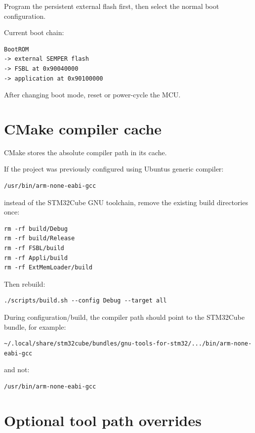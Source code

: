 \documentclass[10pt,a4paper,oneside]{report}
\begin{document}
Program the persistent external flash first, then select the normal boot configuration.

Current boot chain:

\begin{verbatim}
BootROM
-> external SEMPER flash
-> FSBL at 0x90040000
-> application at 0x90100000
\end{verbatim}

After changing boot mode, reset or power-cycle the MCU.

\section{CMake compiler cache}\label{wiki-getting-started-build-flash-debug--12-cmake-compiler-cache}

CMake stores the absolute compiler path in its cache.

If the project was previously configured using Ubuntu\textquotesingle s generic compiler:

\begin{verbatim}
/usr/bin/arm-none-eabi-gcc
\end{verbatim}

instead of the STM32Cube GNU toolchain, remove the existing build directories once:

\begin{verbatim}
rm -rf build/Debug
rm -rf build/Release
rm -rf FSBL/build
rm -rf Appli/build
rm -rf ExtMemLoader/build
\end{verbatim}

Then rebuild:

\begin{verbatim}
./scripts/build.sh --config Debug --target all
\end{verbatim}

During configuration/build, the compiler path should point to the STM32Cube bundle, for example:

\begin{verbatim}
~/.local/share/stm32cube/bundles/gnu-tools-for-stm32/.../bin/arm-none-eabi-gcc
\end{verbatim}

and not:

\begin{verbatim}
/usr/bin/arm-none-eabi-gcc
\end{verbatim}

\section{Optional tool path overrides}\label{wiki-getting-started-build-flash-debug--13-optional-tool-path-overrides}
\end{document}

